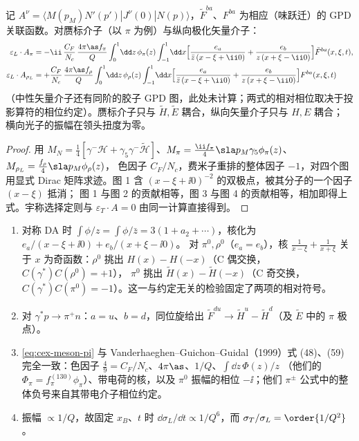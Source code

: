 \begin{proposition}[LO 纵向介子电产生振幅]\tagR\label{prop:cex-meson}
记 $A^\nu=\langle M(p_M)N'(p')|J^\nu(0)|N(p)\rangle$，$\tilde F^{ba}$、$F^{ba}$ 为相应（味跃迁）的 GPD 关联函数。对赝标介子（以 $\pi$ 为例）与纵向极化矢量介子：
\begin{align}
\varepsilon_L\cdot A_\pi&=-\ii\,\frac{C_F}{N_c}\,\frac{4\pi\as f_\pi}{Q}\int_0^1\!\dd z\,\phi_\pi(z)\int_{-1}^1\!\dd x\Big[\frac{e_a}{\bar z\,(x-\xi+\ii0)}+\frac{e_b}{z\,(x+\xi-\ii0)}\Big]\tilde F^{ba}(x,\xi,t),\label{eq:cex-meson-pi}\\
\varepsilon_L\cdot A_{\rho_L}&=+\frac{C_F}{N_c}\,\frac{4\pi\as f_\rho}{Q}\int_0^1\!\dd z\,\phi_\rho(z)\int_{-1}^1\!\dd x\Big[\frac{e_a}{\bar z\,(x-\xi+\ii0)}+\frac{e_b}{z\,(x+\xi-\ii0)}\Big]F^{ba}(x,\xi,t)\label{eq:cex-meson-rho}
\end{align}
（中性矢量介子还有同阶的胶子 GPD 图，此处未计算；两式的相对相位取决于投影算符的相位约定）。赝标介子只与 $\tilde H,\tilde E$ 耦合，纵向矢量介子只与 $H,E$ 耦合；
横向光子的振幅在领头扭度为零。
\end{proposition}

\begin{proof}
用 $M_N=\frac14[\gamma^-\mathcal H+\gamma_5\gamma^-\tilde{\mathcal H}]$、$M_\pi=\frac{\ii f_\pi}4\sla p_M\gamma_5\phi_\pi(z)$、$M_{\rho_L}=\frac{f_\rho}4\sla p_M\phi_\rho(z)$，
色因子 $C_F/N_c$，费米子重排的整体因子 $-1$，对四个图用显式 Dirac 矩阵求迹。图 1 含 $(x-\xi+\ii0)^{-2}$ 的双极点，被其分子的一个因子 $(x-\xi)$ 抵消；
图 1 与图 2 的贡献相等，图 3 与图 4 的贡献相等，相加即得上式。宇称选择定则与 $\varepsilon_T\cdot A=0$ 由同一计算直接得到。
\end{proof}

\begin{remark}[对称性检验与文献对照]\label{rem:cex-meson}
\begin{enumerate}[label=(\roman*)]
\item 对称 DA 时 $\int\phi/z=\int\phi/\bar z=3(1+a_2+\cdots)$，核化为 $e_a/(x-\xi+\ii0)+e_b/(x+\xi-\ii0)$。
对 $\pi^0,\rho^0$（$e_a=e_b$），核 $\frac1{x-\xi}+\frac1{x+\xi}$ 关于 $x$ 为奇函数：$\rho^0$ 挑出 $H(x)-H(-x)$（C 偶交换，$C(\gamma^*)C(\rho^0)=+1$），
$\pi^0$ 挑出 $\tilde H(x)-\tilde H(-x)$（C 奇交换，$C(\gamma^*)C(\pi^0)=-1$）。这一与约定无关的检验固定了两项的相对符号。
\item 对 $\gamma^*p\to\pi^+n$：$a=u$、$b=d$，同位旋给出 $\tilde F^{du}\to\tilde H^u-\tilde H^d$（及 $\tilde E$ 中的 $\pi$ 极点）。
\item \cref{eq:cex-meson-pi} 与 Vanderhaeghen--Guichon--Guidal（1999）式 (48)、(59) 完全一致：色因子 $\frac49=C_F/N_c$、$4\pi\as$、$1/Q$、$\int\dd z\,\Phi(z)/z$
（他们的 $\Phi_\pi=f_\pi^{(130)}\phi_\pi$）、带电荷的核，以及 $\pi^0$ 振幅的相位 $-\ii$；他们 $\pi^\pm$ 公式中的整体负号来自其带电介子相位约定。
\item 振幅 $\propto1/Q$，故固定 $x_B$、$t$ 时 $\dd\sigma_L/\dd t\propto1/Q^6$，而 $\sigma_T/\sigma_L=\order{1/Q^2}$。
\end{enumerate}
\end{remark}

